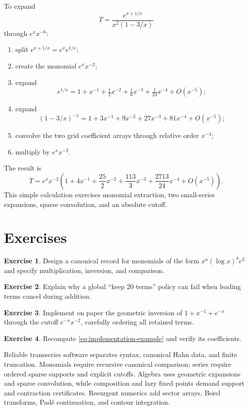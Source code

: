 \documentclass[11pt,openany]{book}
\theoremstyle{definition}
\newtheorem{exercise}{Exercise}[chapter]
\theoremstyle{plain}
\theoremstyle{remark}
\begin{document}
To expand
\[
 T=\frac{e^{x+1/x}}{x^2(1-3/x)}
\]
through $e^xx^{-6}$:
\begin{enumerate}
 \item split $e^{x+1/x}=e^xe^{1/x}$;
 \item create the monomial $e^xx^{-2}$;
 \item expand
 \[
 e^{1/x}=1+x^{-1}+\tfrac12x^{-2}+\tfrac16x^{-3}+\tfrac1{24}x^{-4}+O(x^{-5});
 \]
 \item expand
 \[
 (1-3/x)^{-1}=1+3x^{-1}+9x^{-2}+27x^{-3}+81x^{-4}+O(x^{-5});
 \]
 \item convolve the two grid coefficient arrays through relative order $x^{-4}$;
 \item multiply by $e^xx^{-2}$.
\end{enumerate}
The result is
\begin{equation}\label{eq:implementation-example}
 T=e^xx^{-2}\left(
 1+4x^{-1}+\frac{25}{2}x^{-2}
 +\frac{113}{3}x^{-3}
 +\frac{2713}{24}x^{-4}
 +O(x^{-5})\right).
\end{equation}
This simple calculation exercises monomial extraction, two small-series expansions, sparse convolution, and an absolute cutoff.

\section{Exercises}

\begin{exercise}
Design a canonical record for monomials of the form $x^a(\log x)^b e^L$ and specify multiplication, inversion, and comparison.
\end{exercise}

\begin{exercise}
Explain why a global ``keep 20 terms'' policy can fail when leading terms cancel during addition.
\end{exercise}

\begin{exercise}
Implement on paper the geometric inversion of $1+x^{-1}+e^{-x}$ through the cutoff $e^{-x}x^{-2}$, carefully ordering all retained terms.
\end{exercise}

\begin{exercise}
Recompute \eqref{eq:implementation-example} and verify its coefficients.
\end{exercise}

\begin{summarybox}
Reliable transseries software separates syntax, canonical Hahn data, and finite truncation. Monomials require recursive canonical comparison; series require ordered sparse supports and explicit cutoffs. Algebra uses geometric expansions and sparse convolution, while composition and lazy fixed points demand support and contraction certificates. Resurgent numerics add sector arrays, Borel transforms, Pad\'e continuation, and contour integration.
\end{summarybox}
\end{document}
